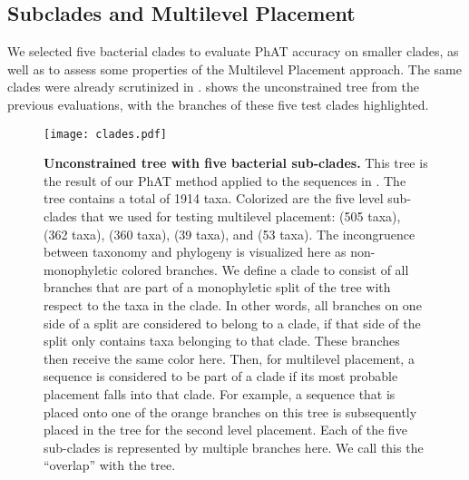 \subsection{Subclades and Multilevel Placement}
\label{ch:AutomaticTrees:sec:Evaluation:sub:MultilevelPlacement}

We selected five bacterial clades to evaluate \ac{PhAT} accuracy on smaller clades,
as well as to assess some properties of the Multilevel Placement approach.
The same clades were already scrutinized in  \citep{Kozlov2016}.
 shows the unconstrained  tree from the previous evaluations,
with the branches of these five test clades highlighted.

\begin{figure}[hpbt]
    \centering
    \texttt{[image: clades.pdf]}
    \vspace*{0.5em}
    \caption[Unconstrained  tree with five bacterial sub-clades]{
        \textbf{Unconstrained  tree with five bacterial sub-clades.}
        This tree is the result of our \ac{PhAT} method
        applied to the  sequences in .
        The tree contains a total of 1914 taxa.
        Colorized are the five  level sub-clades that we used for testing multilevel placement:
         (505 taxa),  (362 taxa),  (360 taxa),
         (39 taxa), and  (53 taxa).
        The incongruence between taxonomy and phylogeny is visualized here as non-monophyletic colored branches.
        We define a clade to consist of all branches
        that are part of a monophyletic split of the tree with respect to the taxa in the clade.
        In other words, all branches on one side of a split are considered to belong to a clade,
        if that side of the split only contains taxa belonging to that clade.
        These branches then receive the same color here.
        Then, for multilevel placement, a sequence is considered to be part of a clade
        if its most probable placement falls into that clade.
        For example, a sequence that is placed onto one of the orange branches on this tree
        is subsequently placed in the  tree for the second level placement.
        Each of the five sub-clades is represented by multiple branches here.
        We call this the ``overlap'' with the  tree.
    }
    \label{fig:clades}
\end{figure}

